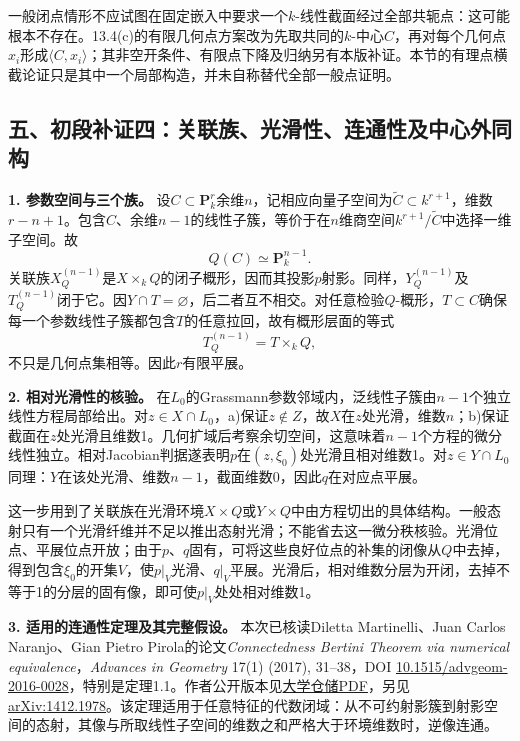 一般闭点情形不应试图在固定嵌入中要求一个$k$-线性截面经过全部共轭点：这可能根本不存在。13.4(c)的有限几何点方案改为先取共同的$k$-中心$C$，再对每个几何点$x_i$形成$\langle C,x_i\rangle$；其非空开条件、有限点下降及归纳另有本版补证。本节的有理点横截论证只是其中一个局部构造，并未自称替代全部一般点证明。

\subsection*{五、初段补证四：关联族、光滑性、连通性及中心外同构}

\noindent\textbf{1. 参数空间与三个族。}
设$C\subset\mathbf P^r_k$余维$n$，记相应向量子空间为$\widetilde C\subset k^{r+1}$，维数$r-n+1$。包含$C$、余维$n-1$的线性子簇，等价于在$n$维商空间$k^{r+1}/\widetilde C$中选择一维子空间。故
\[
Q(C)\simeq\mathbf P^{n-1}_k.
\]
关联族$X_Q^{(n-1)}$是$X\times_k Q$的闭子概形，因而其投影$p$射影。同样，$Y_Q^{(n-1)}$及$T_Q^{(n-1)}$闭于它。因$Y\cap T=\varnothing$，后二者互不相交。对任意检验$Q$-概形，$T\subset C$确保每一个参数线性子簇都包含$T$的任意拉回，故有概形层面的等式
\[
T_Q^{(n-1)}=T\times_k Q,
\]
不只是几何点集相等。因此$r$有限平展。

\noindent\textbf{2. 相对光滑性的核验。}
在$L_0$的Grassmann参数邻域内，泛线性子簇由$n-1$个独立线性方程局部给出。对$z\in X\cap L_0$，a)保证$z\notin Z$，故$X$在$z$处光滑，维数$n$；b)保证截面在$z$处光滑且维数1。几何扩域后考察余切空间，这意味着$n-1$个方程的微分线性独立。相对Jacobian判据遂表明$p$在$(z,\xi_0)$处光滑且相对维数1。对$z\in Y\cap L_0$同理：$Y$在该处光滑、维数$n-1$，截面维数0，因此$q$在对应点平展。

这一步用到了关联族在光滑环境$X\times Q$或$Y\times Q$中由方程切出的具体结构。一般态射只有一个光滑纤维并不足以推出态射光滑；不能省去这一微分秩核验。光滑位点、平展位点开放；由于$p$、$q$固有，可将这些良好位点的补集的闭像从$Q$中去掉，得到包含$\xi_0$的开集$V$，使$p|_V$光滑、$q|_V$平展。光滑后，相对维数分层为开闭，去掉不等于1的分层的固有像，即可使$p|_V$处处相对维数1。

\noindent\textbf{3. 适用的连通性定理及其完整假设。}
本次已核读Diletta Martinelli、Juan Carlos Naranjo、Gian Pietro Pirola的论文\emph{Connectedness Bertini Theorem via numerical equivalence}，\emph{Advances in Geometry} 17(1) (2017), 31--38，DOI \href{https://doi.org/10.1515/advgeom-2016-0028}{10.1515/advgeom-2016-0028}，特别是定理1.1。作者公开版本见\href{https://diposit.ub.edu/server/api/core/bitstreams/d9e33fe8-dd1c-42a4-a579-a349a203ca25/content}{大学仓储PDF}，另见\href{https://arxiv.org/abs/1412.1978}{arXiv:1412.1978}。该定理适用于任意特征的代数闭域：从不可约射影簇到射影空间的态射，其像与所取线性子空间的维数之和严格大于环境维数时，逆像连通。

